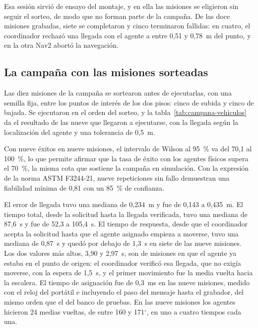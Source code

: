 Esa sesión sirvió de ensayo del montaje, y en ella las misiones se eligieron sin seguir el sorteo, de modo que no forman parte de la campaña. De las doce misiones grabadas, siete se completaron y cinco terminaron fallidas: en cuatro, el coordinador rechazó una llegada con el agente a entre 0,51 y 0,78~m del punto, y en la otra Nav2 abortó la navegación.

\subsection{La campaña con las misiones sorteadas}

Las diez misiones de la campaña se sortearon antes de ejecutarlas, con una semilla fija, entre los puntos de interés de los dos pisos: cinco de subida y cinco de bajada. Se ejecutaron en el orden del sorteo, y la tabla~\ref{tab:campana-vehiculos} da el resultado de las nueve que llegaron a ejecutarse, con la llegada según la localización del agente y una tolerancia de 0,5~m.

Con nueve éxitos en nueve misiones, el intervalo de Wilson al 95~\% va del 70,1 al 100~\%, lo que permite afirmar que la tasa de éxito con los agentes físicos supera el 70~\%, la misma cota que sostiene la campaña en simulación. Con la expresión de la norma ASTM F3244-21, nueve repeticiones sin fallo demuestran una fiabilidad mínima de 0,81 con un 85~\% de confianza.

El error de llegada tuvo una mediana de 0,234~m y fue de 0,143 a 0,435~m. El tiempo total, desde la solicitud hasta la llegada verificada, tuvo una mediana de 87,6~s y fue de 52,3 a 105,4~s. El tiempo de respuesta, desde que el coordinador acepta la solicitud hasta que el agente asignado empieza a moverse, tuvo una mediana de 0,87~s y quedó por debajo de 1,3~s en siete de las nueve misiones. Los dos valores más altos, 3,90 y 2,97~s, son de misiones en que el agente ya estaba en el punto de origen: el coordinador verificó esa llegada, que no exigía moverse, con la espera de 1,5~s, y el primer movimiento fue la media vuelta hacia la escalera. El tiempo de asignación fue de 0,3~ms en las nueve misiones, medido con el reloj del portátil e incluyendo el paso del mensaje hasta el grabador, del mismo orden que el del banco de pruebas. En las nueve misiones los agentes hicieron 24 medias vueltas, de entre 160 y 171$^\circ$, en uno a cuatro tiempos cada una.

